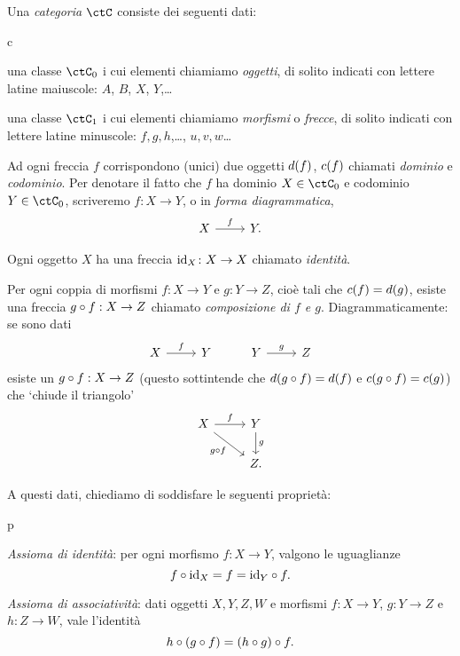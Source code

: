 \begin{definition}[Categoria]\label{def_categ}
	Una \emph{categoria} \(\ctC\) consiste dei seguenti dati:
	\begin{enumtag}{c}
		\item\label{c_1} una classe \(\ctC_0\) i cui elementi chiamiamo \emph{oggetti}, di solito indicati con lettere latine maiuscole: \(A\), \(B\), \(X\), \(Y\),\dots
		\item\label{c_2} una classe \(\ctC_1\) i cui elementi chiamiamo \emph{morfismi} o \emph{frecce}, di solito indicati con lettere latine minuscole: \(f,g,h\),\dots, \(u,v,w\)\dots
		\item\label{c_3} Ad ogni freccia \(f\) corrispondono (unici) due oggetti \(d(f)\), \(c(f)\) chiamati \emph{dominio} e \emph{codominio}. Per denotare il fatto che \(f\) ha dominio \(X\in\ctC_0\) e codominio \(Y\in\ctC_0\), scriveremo \(f\colon X\to Y\), o in \emph{forma diagrammatica},
		\[\begin{tikzcd} X \ar[r, "f"] & Y. \end{tikzcd}\]
		\item\label{c_4} Ogni oggetto \(X\) ha una freccia \(\mathrm{id}_X\colon X\to X\) chiamato \emph{identità}.
		\item\label{c_5} Per ogni coppia di morfismi \(f\colon X\to Y\) e \(g\colon Y\to Z\), cioè tali che \(c(f)=d(g)\), esiste una freccia \(g\circ f:X\to Z\) chiamato \emph{composizione di \(f\) e \(g\)}. Diagrammaticamente: se sono dati
		\[
			\begin{tikzcd}
				X \ar{r}{f}
				& Y & Y \ar{r}{g} & Z
			\end{tikzcd}
		\]
		esiste un \(g\circ f : X\to Z\) (questo sottintende che \(d(g\circ f)=d(f)\) e \(c(g\circ f)=c(g)\)) che `chiude il triangolo'
		\[\begin{tikzcd}
				X \ar[r, "f"] \ar[dr, "g\cmp f"'] & Y\ar[d, "g"] \\
				& Z.
			\end{tikzcd}\]
	\end{enumtag}
	A questi dati, chiediamo di soddisfare le seguenti proprietà:
	\begin{enumtag}{p}
		\item \label{cp_1} \emph{Assioma di identità}: per ogni morfismo \(f:X\to Y\), valgono le uguaglianze
		\[f\circ\mathrm{id}_X=f=\mathrm{id}_Y\circ f.\]
		\item \label{cp_2} \emph{Assioma di associatività}: dati oggetti \(X,Y,Z,W\) e morfismi \(f:X\to Y\), \(g:Y\to Z\) e \(h:Z\to W\), vale l'identità
		\[h\circ (g\circ f) = (h\circ g)\circ f.\]
	\end{enumtag}
\end{definition}
